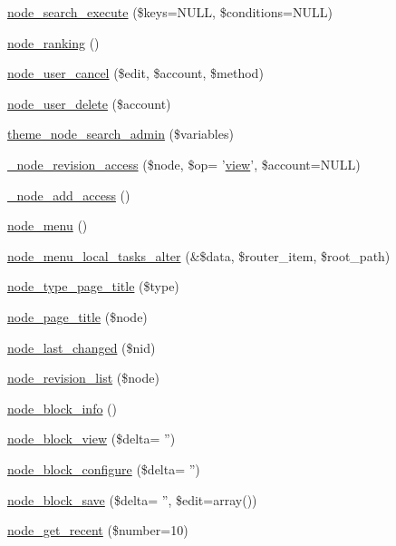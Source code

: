 \begin{DoxyCompactItemize}
\hyperlink{node_8module_ad7047dcdd1c1934351adb73de080c640}{node\_\-search\_\-execute} (\$keys=NULL, \$conditions=NULL)
\item 
\hyperlink{node_8module_ae82543a4b619eb30da1ac2bbb3bd2842}{node\_\-ranking} ()
\item 
\hyperlink{node_8module_a9411160c6584d13957fd07bd952f54df}{node\_\-user\_\-cancel} (\$edit, \$account, \$method)
\item 
\hyperlink{node_8module_a5c461dbda38fb52f70fbb45027f9a021}{node\_\-user\_\-delete} (\$account)
\item 
\hyperlink{group__themeable_ga047126c1afd64a21474b5c8d1da35e00}{theme\_\-node\_\-search\_\-admin} (\$variables)
\item 
\hyperlink{node_8module_a79b5bb64052b724d7e1ec53890762174}{\_\-node\_\-revision\_\-access} (\$node, \$op= '\hyperlink{classview}{view}', \$account=NULL)
\item 
\hyperlink{node_8module_afd478b7c5d729b1f2affdaf30a6999c3}{\_\-node\_\-add\_\-access} ()
\item 
\hyperlink{node_8module_a15e8d85a7559f22b8f2c77c1d5dfac63}{node\_\-menu} ()
\item 
\hyperlink{node_8module_a3aea86c33ef8c4f752d5db0f8d445426}{node\_\-menu\_\-local\_\-tasks\_\-alter} (\&\$data, \$router\_\-item, \$root\_\-path)
\item 
\hyperlink{node_8module_a30a46060119997578241d929b2de9e4f}{node\_\-type\_\-page\_\-title} (\$type)
\item 
\hyperlink{node_8module_acc30cb4ee1c9fd09fefbf193956f76e9}{node\_\-page\_\-title} (\$node)
\item 
\hyperlink{node_8module_ab303a54f9fd1d97c981f86a84610920b}{node\_\-last\_\-changed} (\$nid)
\item 
\hyperlink{node_8module_a50640e4f9b25dcdd939524cd57271fae}{node\_\-revision\_\-list} (\$node)
\item 
\hyperlink{node_8module_a3fe724ba9acdd433c716acaf8477034a}{node\_\-block\_\-info} ()
\item 
\hyperlink{node_8module_aa65ec77d9ea5b70fee4e42d36cc4e525}{node\_\-block\_\-view} (\$delta= '')
\item 
\hyperlink{node_8module_a593cb533d01af96e961a71a919784c78}{node\_\-block\_\-configure} (\$delta= '')
\item 
\hyperlink{node_8module_a6634702b48e7d684464665c035076bcc}{node\_\-block\_\-save} (\$delta= '', \$edit=array())
\item 
\hyperlink{node_8module_a10539626311cdc9670fc1e0337cd6a60}{node\_\-get\_\-recent} (\$number=10)

\end{DoxyCompactItemize}
